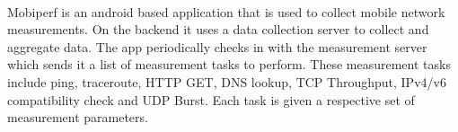 \paragraph{}
Mobiperf is an android based application that is used to collect mobile network measurements. On the backend it uses a data collection server to collect and aggregate data. The app periodically checks in with the measurement server which sends it a list of measurement tasks to perform. These measurement tasks include ping, traceroute, HTTP GET, DNS lookup, TCP Throughput, IPv4/v6 compatibility check and UDP Burst. Each task is given a respective set of measurement parameters.
